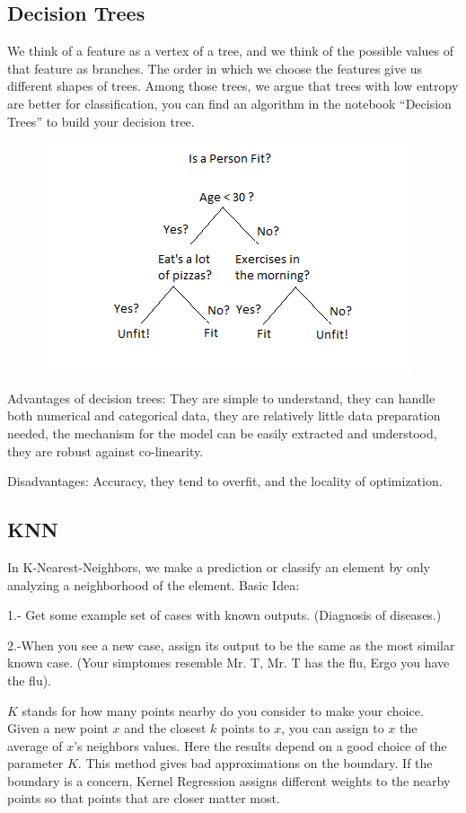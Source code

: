 \documentclass[11pt,letterpaper]{report}
\begin{document}
	 \subsection{Decision Trees}
 We think of a feature as a vertex of a tree, and we think of the possible values of that feature as branches. The order in which we choose the features give us different shapes of trees. Among those trees, we argue that trees with low entropy are better for classification, you can find an algorithm in the notebook ``Decision Trees'' to build your decision tree.


\begin{figure}[h!]
	\centering
	\includegraphics[width=0.45\linewidth]{figures/Decision-Trees.png}
	\caption{}
	\label{fig:Trees}
\end{figure} 	
Advantages of decision trees:
They are simple to understand, they can handle both numerical and categorical data, they are relatively little data preparation needed, the mechanism for the model can be easily extracted and understood, they are robust against co-linearity.

 Disadvantages: Accuracy, they tend to overfit, and the locality of optimization.
 
 
 \subsection{KNN}
 In K-Nearest-Neighbors, we make a prediction or classify an element by  only analyzing  a neighborhood of the element.  Basic Idea:
 
 1.- Get some example set of cases with known outputs. (Diagnosis of diseases.)
 
 2.-When you see a new case, assign its output to be the same as the most similar known case. (Your simptomes resemble Mr. T, Mr. T has the flu, Ergo you have the flu).

 $K$ stands for how many points nearby do you consider to make your choice. Given a new point $x$ and the closest $k$ points to $x$, you can assign to $x$ the average of $x$'s neighbors values. Here the results depend on a good choice of the parameter $K$. This method gives bad approximations on the boundary. If the boundary is a concern,  Kernel Regression assigns different weights to the nearby points so that points that are closer matter most. 
 
\end{document}
